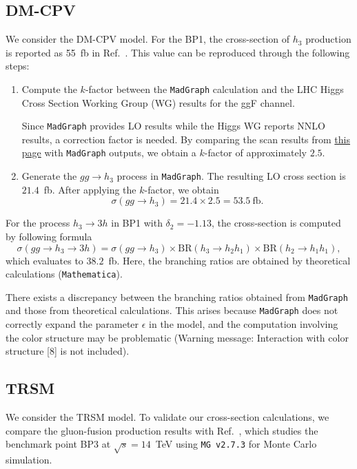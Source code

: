 \documentclass[12pt]{article}
\begin{document}
    \subsection{DM-CPV}%
    \label{sub:dm_cpv}
        We consider the DM-CPV model. For the BP1, the cross-section of $h_3$ production is reported as 55~fb in Ref.~\cite{Chen:2022vac}. This value can be reproduced through the following steps:
        \begin{enumerate}
            \item Compute the $k$-factor between the \verb|MadGraph| calculation and the LHC Higgs Cross Section Working Group (WG) results for the ggF channel.  

            Since \verb|MadGraph| provides LO results while the Higgs WG reports NNLO results, a correction factor is needed. By comparing the scan results from \href{https://twiki.cern.ch/twiki/bin/view/LHCPhysics/CERNYellowReportPageBSMAt14TeV}{this page} with \verb|MadGraph| outputs, we obtain a $k$-factor of approximately $2.5$.  

            \item Generate the $gg \to h_3$ process in \verb|MadGraph|. The resulting LO cross section is $21.4$~fb. After applying the $k$-factor, we obtain  
            \[
                \sigma(gg \to h_3) = 21.4 \times 2.5 = 53.5~\text{fb}.
            \]
        \end{enumerate}
        For the process $h_3 \to 3h$ in BP1 with $\delta_2 = -1.13$, the cross-section is computed by following formula
        \[
            \sigma\left(gg \to h_3 \to 3h\right) = \sigma(gg \to h_3) \times \mathrm{BR}(h_3 \to h_2 h_1) \times \mathrm{BR}(h_2 \to h_1 h_1),
        \]
        which evaluates to $38.2$~fb. Here, the branching ratios are obtained by theoretical calculations (\verb|Mathematica|).

        There exists a discrepancy between the branching ratios obtained from \verb|MadGraph| and those from theoretical calculations. This arises because \verb|MadGraph| does not correctly expand the parameter $\epsilon$ in the model, and the computation involving the color structure may be problematic (Warning message: Interaction with color structure [8] is not included).
    \subsection{TRSM}%
    \label{sub:trsm}
        We consider the TRSM model. To validate our cross-section calculations, we compare the gluon-fusion production results with Ref.~\cite{Papaefstathiou:2020lyp}, which studies the benchmark point BP3 at $\sqrt{s} = 14$~TeV using \verb|MG v2.7.3| for Monte Carlo simulation.
\end{document}
